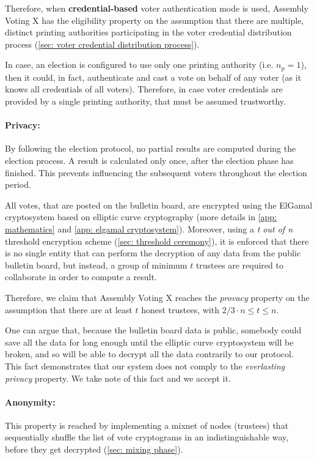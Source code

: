 Therefore, when \textbf{credential-based} voter authentication mode is used, Assembly Voting X has the eligibility property on the assumption that there are multiple, distinct printing authorities participating in the voter credential distribution process (\cref{sec: voter credential distribution process}).

In case, an election is configured to use only one printing authority (i.e. $n_\mathrm{p} = 1$), then it could, in fact, authenticate and cast a vote on behalf of any voter (as it knows all credentials of all voters). Therefore, in case voter credentials are provided by a single printing authority, that must be assumed trustworthy.


\paragraph{Privacy:}
By following the election protocol, no partial results are computed during the election process. A result is calculated only once, after the election phase has finished. This prevents influencing the subsequent voters throughout the election period.

All votes, that are posted on the bulletin board, are encrypted using the ElGamal cryptosystem based on elliptic curve cryptography (more details in \cref{app: mathematics} and \cref{app: elgamal cryptosystem}). Moreover, using a \textit{t out of n} threshold encryption scheme (\cref{sec: threshold ceremony}), it is enforced that there is no single entity that can perform the decryption of any data from the public bulletin board, but instead, a group of minimum $t$ trustees are required to collaborate in order to compute a result.

Therefore, we claim that Assembly Voting X reaches the \textit{provacy} property on the assumption that there are at least $t$ honest trustees, with $2/3 \cdot n \leq t \leq n$.

One can argue that, because the bulletin board data is public, somebody could save all the data for long enough until the elliptic curve cryptosystem will be broken, and so will be able to decrypt all the data contrarily to our protocol. This fact demonstrates that our system does not comply to the \textit{everlasting privacy} property. We take note of this fact and we accept it.


\paragraph{Anonymity:}
This property is reached by implementing a mixnet of nodes (trustees) that sequentially shuffle the list of vote cryptograms in an indistinguishable way, before they get decrypted (\cref{sec: mixing phase}).

